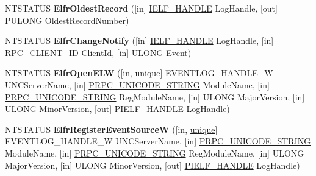 \begin{DoxyCompactItemize}
\item 
\mbox{\label{interfaceeventlog_a05509aaee66808175f8015b9cac0e3f7}} 
N\+T\+S\+T\+A\+T\+US {\bfseries Elfr\+Oldest\+Record} (\mbox{[}in\mbox{]} \hyperlink{interfacevoid}{I\+E\+L\+F\+\_\+\+H\+A\+N\+D\+LE} Log\+Handle, \mbox{[}out\mbox{]} P\+U\+L\+O\+NG Oldest\+Record\+Number)
\item 
\mbox{\label{interfaceeventlog_ac0d6961d0361a757673085c64d1bf9d9}} 
N\+T\+S\+T\+A\+T\+US {\bfseries Elfr\+Change\+Notify} (\mbox{[}in\mbox{]} \hyperlink{interfacevoid}{I\+E\+L\+F\+\_\+\+H\+A\+N\+D\+LE} Log\+Handle, \mbox{[}in\mbox{]} \hyperlink{struct___r_p_c___c_l_i_e_n_t___i_d}{R\+P\+C\+\_\+\+C\+L\+I\+E\+N\+T\+\_\+\+ID} Client\+Id, \mbox{[}in\mbox{]} U\+L\+O\+NG \hyperlink{struct_event}{Event})
\item 
\mbox{\label{interfaceeventlog_aba9b4306ba1f82cbff5fc1eae7b66d9f}} 
N\+T\+S\+T\+A\+T\+US {\bfseries Elfr\+Open\+E\+LW} (\mbox{[}in, \hyperlink{interfaceunique}{unique}\mbox{]} E\+V\+E\+N\+T\+L\+O\+G\+\_\+\+H\+A\+N\+D\+L\+E\+\_\+W U\+N\+C\+Server\+Name, \mbox{[}in\mbox{]} \hyperlink{struct___r_p_c___u_n_i_c_o_d_e___s_t_r_i_n_g}{P\+R\+P\+C\+\_\+\+U\+N\+I\+C\+O\+D\+E\+\_\+\+S\+T\+R\+I\+NG} Module\+Name, \mbox{[}in\mbox{]} \hyperlink{struct___r_p_c___u_n_i_c_o_d_e___s_t_r_i_n_g}{P\+R\+P\+C\+\_\+\+U\+N\+I\+C\+O\+D\+E\+\_\+\+S\+T\+R\+I\+NG} Reg\+Module\+Name, \mbox{[}in\mbox{]} U\+L\+O\+NG Major\+Version, \mbox{[}in\mbox{]} U\+L\+O\+NG Minor\+Version, \mbox{[}out\mbox{]} \hyperlink{interfacevoid}{P\+I\+E\+L\+F\+\_\+\+H\+A\+N\+D\+LE} Log\+Handle)
\item 
\mbox{\label{interfaceeventlog_a943e0992cbb7808c596f8475fa4deba8}} 
N\+T\+S\+T\+A\+T\+US {\bfseries Elfr\+Register\+Event\+SourceW} (\mbox{[}in, \hyperlink{interfaceunique}{unique}\mbox{]} E\+V\+E\+N\+T\+L\+O\+G\+\_\+\+H\+A\+N\+D\+L\+E\+\_\+W U\+N\+C\+Server\+Name, \mbox{[}in\mbox{]} \hyperlink{struct___r_p_c___u_n_i_c_o_d_e___s_t_r_i_n_g}{P\+R\+P\+C\+\_\+\+U\+N\+I\+C\+O\+D\+E\+\_\+\+S\+T\+R\+I\+NG} Module\+Name, \mbox{[}in\mbox{]} \hyperlink{struct___r_p_c___u_n_i_c_o_d_e___s_t_r_i_n_g}{P\+R\+P\+C\+\_\+\+U\+N\+I\+C\+O\+D\+E\+\_\+\+S\+T\+R\+I\+NG} Reg\+Module\+Name, \mbox{[}in\mbox{]} U\+L\+O\+NG Major\+Version, \mbox{[}in\mbox{]} U\+L\+O\+NG Minor\+Version, \mbox{[}out\mbox{]} \hyperlink{interfacevoid}{P\+I\+E\+L\+F\+\_\+\+H\+A\+N\+D\+LE} Log\+Handle)

\end{DoxyCompactItemize}
